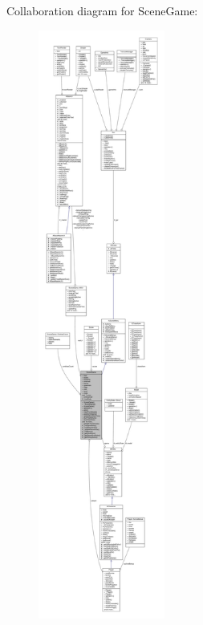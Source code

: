 Collaboration diagram for Scene\+Game\+:
\nopagebreak
\begin{figure}[H]
\begin{center}
\leavevmode
\includegraphics[height=550pt]{class_scene_game__coll__graph}
\end{center}
\end{figure}

